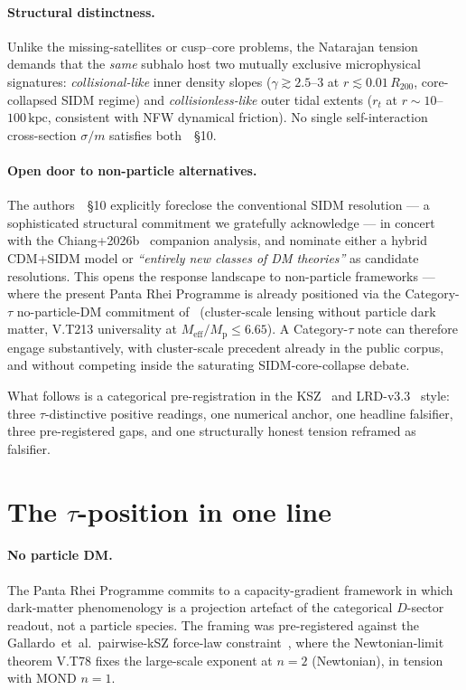 \documentclass{pantarhei-researchnote}
\newcommand{\Meff}{M_{\mathrm{eff}}}
\newcommand{\Mp}{M_{\mathrm{p}}}                %
\newcommand{\Rtwohun}{R_{200}}
\newcommand{\kpc}{\mathrm{kpc}}
\newcommand{\rtid}{r_t}
\begin{document}
\paragraph{Structural distinctness.} Unlike the missing-satellites or
cusp--core problems, the Natarajan tension demands that the \emph{same}
subhalo host two mutually exclusive microphysical signatures:
\emph{collisional-like} inner density slopes
($\gamma \gtrsim 2.5$--$3$ at $r \lesssim 0.01\,\Rtwohun$,
core-collapsed SIDM regime) and \emph{collisionless-like} outer tidal
extents ($\rtid$ at $r \sim 10$--$100\,\kpc$, consistent with NFW dynamical
friction). No single self-interaction cross-section
$\sigma/m$ satisfies both~\cite{Natarajan2026}~\S{}10.

\paragraph{Open door to non-particle alternatives.}
The authors~\cite{Natarajan2026}~\S{}10 explicitly foreclose the
conventional SIDM resolution --- a sophisticated structural commitment
we gratefully acknowledge --- in concert with the
Chiang+2026b~\cite{ChiangSimResolution2026} companion analysis, and
nominate either a hybrid CDM+SIDM model or \emph{``entirely new classes
of DM theories''} as candidate resolutions. This opens the response
landscape to non-particle frameworks --- where the present Panta Rhei
Programme is already positioned via the Category-$\tau$ no-particle-DM
commitment of~\cite{KSZCategorical} (cluster-scale lensing without
particle dark matter, V.T213 universality at $\Meff/\Mp \le 6.65$).
A Category-$\tau$ note can therefore engage substantively, with cluster-scale
precedent already in the public corpus, and without competing inside the
saturating SIDM-core-collapse debate.

What follows is a categorical pre-registration in the
KSZ~\cite{KSZCategorical} and LRD-v3.3~\cite{LRDCategoricalv33} style:
three $\tau$-distinctive positive readings, one numerical anchor, one
headline falsifier, three pre-registered gaps, and one structurally
honest tension reframed as falsifier.

\section{The \texorpdfstring{$\tau$}{tau}-position in one line}\label{sec:tau-position}

\paragraph{No particle DM.} The Panta Rhei Programme commits to a
capacity-gradient framework in which dark-matter phenomenology is a
projection artefact of the categorical $D$-sector readout, not a particle
species. The framing was pre-registered against the Gallardo~et~al.\
pairwise-kSZ force-law constraint~\cite{KSZCategorical}, where the
Newtonian-limit theorem V.T78 fixes the large-scale exponent at
$n = 2$ (Newtonian), in tension with MOND $n = 1$.
\end{document}
